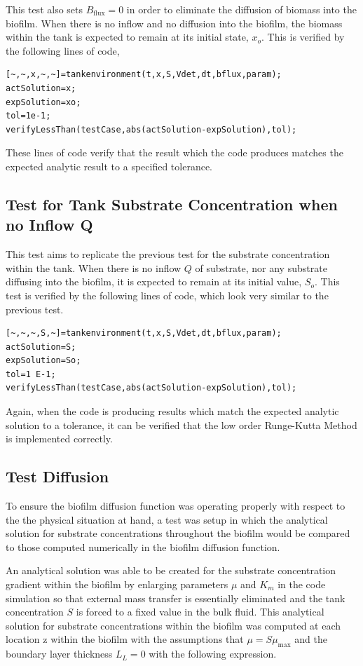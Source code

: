 \documentclass[letterpaper, twoside]{article}
\numberwithin{equation}{section}
\begin{document}
This test also sets $B_\mathrm{flux}=0$ in order to eliminate the diffusion of biomass into the biofilm. 
When there is no inflow and no diffusion into the biofilm, the biomass within the tank is expected to remain at its initial state, $x_o$. This is verified by the following lines of code,

\begin{lstlisting}
[~,~,x,~,~]=tankenvironment(t,x,S,Vdet,dt,bflux,param);
actSolution=x;
expSolution=xo;
tol=1e-1;
verifyLessThan(testCase,abs(actSolution-expSolution),tol);
\end{lstlisting}

These lines of code verify that the result which the code produces matches the expected analytic result to a specified tolerance.

\subsection{Test for Tank Substrate Concentration when no Inflow Q}
This test aims to replicate the previous test for the substrate concentration within the tank. When there is no inflow $Q$ of substrate, nor any substrate diffusing into the biofilm, it is expected to remain at its initial value, $S_o$. This test is verified by the following lines of code, which look very similar to the previous test.

\begin{lstlisting}
[~,~,~,S,~]=tankenvironment(t,x,S,Vdet,dt,bflux,param);
actSolution=S; 
expSolution=So;
tol=1 E-1;
verifyLessThan(testCase,abs(actSolution-expSolution),tol); 
\end{lstlisting}

Again, when the code is producing results which match the expected analytic solution to a tolerance, it can be verified that the low order Runge-Kutta Method is implemented correctly.

\subsection{Test Diffusion}
To ensure the biofilm diffusion function was operating properly with respect to the the physical situation at hand, a test was setup in which the analytical solution for substrate concentrations throughout the biofilm would be compared to those computed numerically in the biofilm diffusion function.

An analytical solution was able to be created for the substrate concentration gradient within the biofilm by enlarging parameters $\mu$ and $K_m$ in the code simulation so that external mass transfer is essentially eliminated and the tank concentration $S$ is forced to a fixed value in the bulk fluid. This analytical solution for substrate concentrations within the biofilm was computed at each location z within the biofilm with the assumptions that $\mu={S}{\mu_\mathrm{max}}$ and the boundary layer thickness $L_L=0$ with the following expression.
\end{document}
